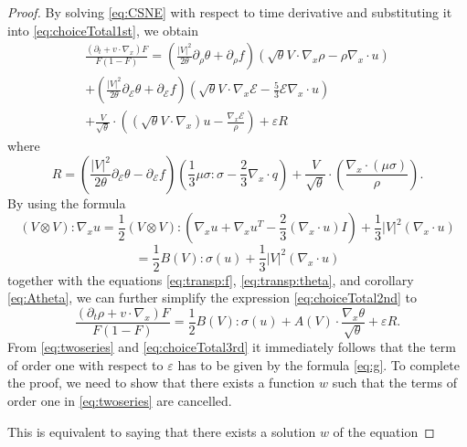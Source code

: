 \begin{proof}
By solving \eqref{eq:CSNE} with respect to time derivative and substituting it into
\eqref{eq:choiceTotal1st}, we obtain 
\begin{equation}\label{eq:choiceTotal2nd}
 \begin{split} \frac{(\partial_t   + v\cdot \nabla_x)F}{F(1-F)} = 
\left(
\frac{|V|^2}{2\theta}\partial_\rho\theta+\partial_\rho f\right) (\sqrt\theta
V\cdot\nabla_x \rho -
\rho\nabla_x\cdot u) \\
+\left(\frac{|V|^2}{2\theta}\partial_{\mathcal
E}\theta+\partial_{\mathcal E}f\right) \left(\sqrt\theta V\cdot\nabla_x \mathcal
E - \frac 53 \mathcal E\nabla_x\cdot u\right) \\ 
+ \frac{V}{\sqrt\theta}\cdot \left(\left(\sqrt\theta V\cdot\nabla_x
\right)u-\frac{\nabla_x\mathcal E}{\rho}\right)+ \varepsilon R\end{split}
\end{equation}
where
\begin{equation*}\label{eq:R}
R=\left(\frac{|V|^2}{2\theta}\partial_{\mathcal
E}\theta-\partial_{\mathcal E}f\right) \left(\frac {1}{3} \mu\sigma:\sigma-\frac
23 \nabla_x\cdot q\right)+\frac{V}{\sqrt\theta}\cdot\left(\frac{ \nabla_x\cdot (\mu\sigma)}{\rho}\right).
\end{equation*}
By using the formula
\[ (V\otimes V):\nabla_xu = \frac 12 (V\otimes
V):\left(\nabla_xu+\nabla_xu^T-\frac23(\nabla_x\cdot u) I \right)+\frac 13
|V|^2(\nabla_x\cdot u) \] 
\[=\frac 12 B(V):\sigma(u)+\frac 13
|V|^2(\nabla_x\cdot u)\]
together with the equations \eqref{eq:transp:f}, \eqref{eq:transp:theta}, and corollary \ref{eq:Atheta}, we can further simplify the expression \eqref{eq:choiceTotal2nd} to 
\begin{equation}\label{eq:choiceTotal3rd}
  \frac{(\partial_t \rho + v\cdot \nabla_x)F}{F(1-F)} =\frac 12 B(V):\sigma(u)  
+A(V)\cdot \frac{\nabla_x\theta}{\sqrt\theta}+\varepsilon R.
\end{equation}
From \eqref{eq:twoseries} and
\eqref{eq:choiceTotal3rd} it immediately follows that the term of   order one with respect to $\varepsilon$ has to be given by the formula \eqref{eq:g}.
To complete the proof, we need to show that there exists a function $w$ such that the terms of order one in \eqref{eq:twoseries} are cancelled.

This is equivalent to saying that there exists a solution  $w$ of the equation


\end{proof}

